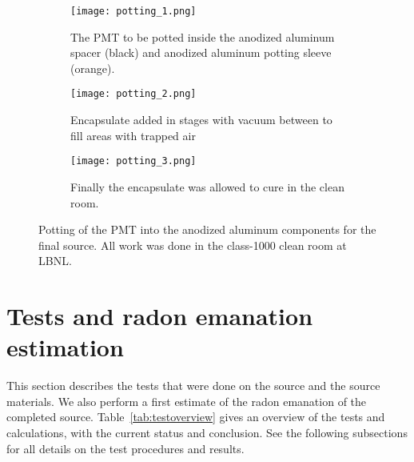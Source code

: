 \begin{figure}
\begin{subfigure}{.385\textwidth}
  \texttt{[image: potting\_1.png]}
  \caption{The PMT to be potted inside the anodized aluminum spacer (black) and anodized aluminum potting sleeve (orange).}
  \label{fig:potting_a}
\end{subfigure}
\begin{subfigure}{.305\textwidth}
  \texttt{[image: potting\_2.png]}
  \caption{Encapsulate added in stages with vacuum between to fill areas with trapped air}
  \label{fig:potting_b}
\end{subfigure}
\begin{subfigure}{.29\textwidth}
  \texttt{[image: potting\_3.png]}
  \caption{Finally the encapsulate was allowed to cure in the clean room.}
  \label{fig:potting_c}
\end{subfigure}
\caption{Potting of the PMT into the anodized aluminum components for the final source. All work was done in the class-1000 clean room at LBNL.}
\label{fig:potting}
\end{figure}

\section{Tests and radon emanation estimation}
\label{chap:tests}

This section describes the tests that were done on the source and the source materials. We also perform a first estimate of the radon emanation of the completed source. Table~\ref{tab:testoverview} gives an overview of the tests and calculations, with the current status and conclusion. See the following subsections for all details on the test procedures and results. 

